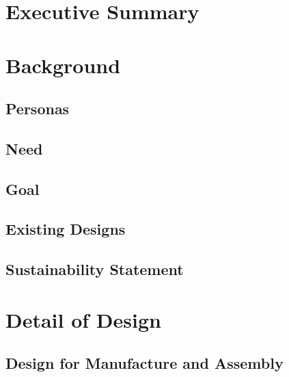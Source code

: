\documentclass{article}
\begin{document}
\maketitle
\newpage

\section{Executive Summary}




\newpage
\tableofcontents
\newpage

\section{Background}
\subsection{Personas}






\subsection{Need}

\subsection{Goal}


\subsection{Existing Designs}


\subsection{Sustainability Statement}


\section{Detail of Design}
\subsection{Design for Manufacture and Assembly}

\end{document}

